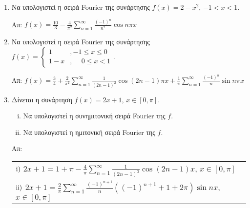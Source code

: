 \begin{enumerate}
  \item Να υπολογιστεί η σειρά Fourier της συνάρτησης $ f(x) = 2-x^{2} $, $ -1<x<1 $.

    \hfill Απ: $ f(x) = \frac{10}{3} - \frac{4}{\pi ^{2}} \sum_{n=1}^{\infty} 
    \frac{(-1)^{n}}{n^{2}} \cos{n \pi x}  $ 

  \item Να υπολογιστεί η σειρά Fourier της συνάρτησης $ f(x) = \begin{cases} 
      1 &, -1 \leq x \leq 0 \\
      1-x &, \phantom{-}0 \leq x <1
    \end{cases} $.

    \hfill Απ: $ f(x) = \frac{3}{4} + \frac{2}{\pi ^{2}} \sum_{n=1}^{\infty} 
    \frac{1}{(2n-1)^{2}} \cos{(2n-1) \pi x} + \frac{1}{\pi} \sum_{n=1}^{\infty} 
    \frac{(-1)^{n}}{n} \sin{n \pi x}   $ 

  \item Δίνεται η συνάρτηση $ f(x) = 2x+1 $, $ x \in [0, \pi] $.

    \begin{enumerate}[i)]
      \item Να υπολογιστεί η συνημιτονική σειρά Fourier της $f$.
      \item Να υπολογιστεί η ημιτονική σειρά Fourier της $f$.
    \end{enumerate}

    \hfill Απ: \begin{tabular}{l}
      $\rm i)$ $ 2x+1 = 1 + \pi - \frac{4}{\pi} \sum_{n=1}^{\infty}
      \frac{1}{(2n-1)^{2}}\cos{(2n-1)x} $, $ x \in [0, \pi] $ \\
      $\rm ii)$ $  2x+1 = \frac{2}{\pi} \sum_{n=1}^{\infty} \frac{(-1)^{n+1}}{n} 
      \left((-1)^{n+1}+1+2 \pi\right) \sin{nx} $, $ x \in [0, \pi] $
    \end{tabular} 
\end{enumerate}



